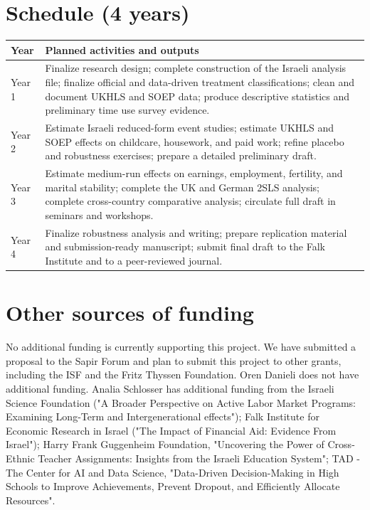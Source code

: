 \documentclass[12pt]{article}
\begin{document}
\section{Schedule (4 years)}

\begin{center}
\begin{tabularx}{0.98\textwidth}{>{\raggedright\arraybackslash}p{1.7cm} X}
\toprule
\textbf{Year} & \textbf{Planned activities and outputs} \\
\midrule
Year 1 & Finalize research design; complete construction of the Israeli analysis file; finalize official and data-driven treatment classifications; clean and document UKHLS and SOEP data; produce descriptive statistics and preliminary time use survey evidence. \\
Year 2 & Estimate Israeli reduced-form event studies; estimate UKHLS and SOEP effects on childcare, housework, and paid work; refine placebo and robustness exercises; prepare a detailed preliminary draft. \\
Year 3 & Estimate medium-run effects on earnings, employment, fertility, and marital stability; complete the UK and German 2SLS analysis; complete cross-country comparative analysis; circulate full draft in seminars and workshops. \\
Year 4 & Finalize robustness analysis and writing; prepare replication material and submission-ready manuscript; submit final draft to the Falk Institute and to a peer-reviewed journal. \\
\bottomrule
\end{tabularx}
\end{center}


\section{Other sources of funding}
No additional funding is currently supporting this project. We have submitted a proposal to the Sapir Forum and plan to submit this project to other grants, including the ISF and the Fritz Thyssen Foundation. Oren Danieli does not have additional funding. 
Analia Schlosser has additional funding from the Israeli Science Foundation ("A Broader Perspective on Active Labor Market Programs: Examining Long-Term and Intergenerational effects"); Falk Institute for Economic Research in Israel ("The Impact of Financial Aid: Evidence From Israel"); Harry Frank Guggenheim Foundation, "Uncovering the Power of Cross-Ethnic Teacher Assignments: Insights from the Israeli Education System"; TAD - The Center for AI and Data Science, "Data-Driven Decision-Making in High Schools to Improve Achievements, Prevent Dropout, and Efficiently Allocate Resources".




\renewcommand{\refname}{References}


\end{document}
